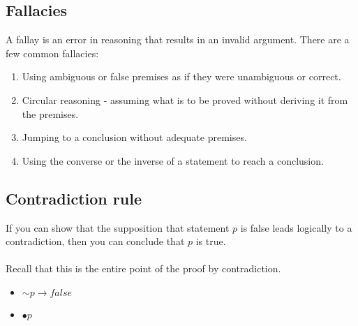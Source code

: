 \documentclass[a4paper]{article}
\begin{document}
\subsection{Fallacies}
A fallay is an error in reasoning that results in an invalid argument.
There are a few common fallacies:
\begin{enumerate}
	\item Using ambiguous or false premises as if they were unambiguous or correct.
	\item Circular reasoning - assuming what is to be proved without deriving it from the premises.
	\item Jumping to a conclusion without adequate premises.
	\item Using the converse or the inverse of a statement to reach a conclusion.
\end{enumerate}
\subsection{Contradiction rule}
If you can show that the supposition that statement $p$ is false leads logically to a contradiction, then you can conclude that $p$ is true.\\ 
\\Recall that this is the entire point of the proof by contradiction.\\
\begin{varwidth}[t]{.5\textwidth}
	\begin{itemize}
		\itemsep0em
		\item[] $\sim p \rightarrow false$
		\item[] $\bullet p$
	\end{itemize}
\end{varwidth}
\newpage
\appendix
\end{document}
